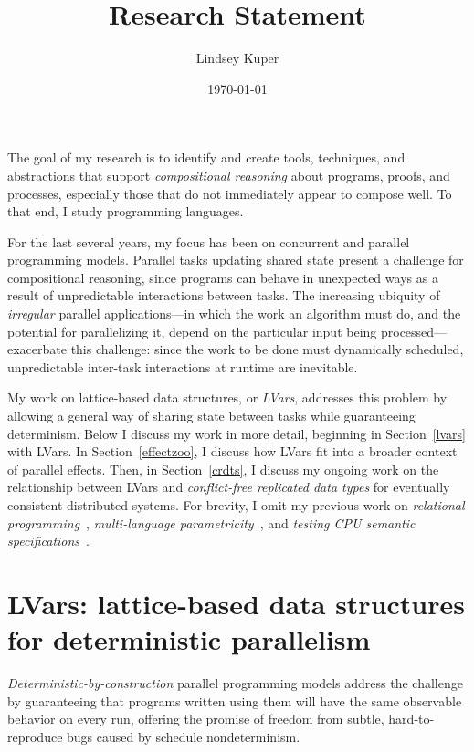 \documentclass{article}
\def\name{Lindsey Kuper}
\begin{document}
\title{Research Statement}

\author{\name}

\date{\today}

\maketitle

\noindent 
The goal of my research is to identify and create tools, techniques,
and abstractions that support \emph{compositional reasoning} about
programs, proofs, and processes, especially those that do not
immediately appear to compose well.  To that end, I study programming
languages.

For the last several years, my focus has been on concurrent and
parallel programming models.  Parallel tasks updating shared state
present a challenge for compositional reasoning, since programs can
behave in unexpected ways as a result of unpredictable interactions
between tasks.  The increasing ubiquity of \emph{irregular} parallel
applications---in which the work an algorithm must do, and the
potential for parallelizing it, depend on the particular input being
processed---exacerbate this challenge: since the work to be done must
dynamically scheduled, unpredictable inter-task interactions at
runtime are inevitable.

My work on lattice-based data structures, or \emph{LVars}, addresses
this problem by allowing a general way of sharing state between tasks
while guaranteeing determinism.  Below I discuss my work in more
detail, beginning in Section~\ref{lvars} with LVars.  In
Section~\ref{effectzoo}, I discuss how LVars fit into a broader
context of parallel effects.  Then, in Section~\ref{crdts}, I discuss
my ongoing work on the relationship between LVars and
\emph{conflict-free replicated data types} for eventually consistent
distributed systems.  For brevity, I omit my previous work on
\emph{relational programming}~\cite{lambdae}, \emph{multi-language
  parametricity}~\cite{multilang-talk}, and \emph{testing CPU semantic
  specifications}~\cite{tsl-tr}.

\section{LVars: lattice-based data structures for deterministic parallelism}

\emph{Deterministic-by-construction} parallel programming
models address the challenge by guaranteeing that programs written
using them will have the same observable behavior on every run,
offering the promise of freedom from subtle, hard-to-reproduce bugs
caused by schedule nondeterminism.
\end{document}
